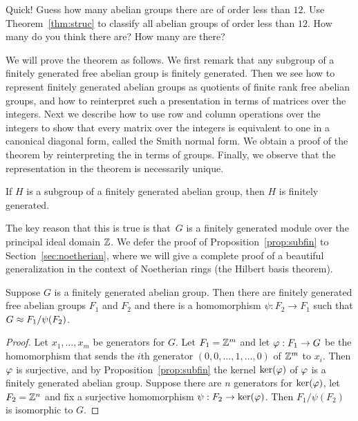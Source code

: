 \begin{exercise}
	Quick! Guess how many abelian groups there are of order less than $12$. Use Theorem~\ref{thm:struc} to classify all abelian groups of order less than $12$. How many do you think there are? How many are there?
\end{exercise}

We will prove the theorem as follows.  We first remark that any
subgroup of a finitely generated free abelian group is finitely
generated.  Then we see how to represent finitely generated abelian groups 
as quotients of finite rank free abelian groups, and how to
reinterpret such a presentation in terms of matrices over the
integers.  Next we describe how to use row and column operations over
the integers to show that every matrix over the integers is equivalent
to one in a canonical diagonal form, called the Smith normal form.  We
obtain a proof of the theorem by reinterpreting the  in
terms of groups.  Finally, we observe that
the representation in the theorem is necessarily unique. 

\begin{proposition}\label{prop:subfin}
If $H$ is a subgroup of a finitely generated abelian group, then $H$
is finitely generated.
\end{proposition}
The key reason that this is true is that~$G$ is a finitely generated
module over the principal ideal domain $\mathbb{Z}$.  We defer the
proof of Proposition~\ref{prop:subfin} to Section~\ref{sec:noetherian},
where we will give a complete proof of a beautiful generalization 
in the context of Noetherian rings (the Hilbert basis theorem).

\begin{corollary}\label{cor:presentation}
Suppose $G$ is a finitely generated abelian group.  Then there are
finitely generated free abelian groups $F_1$ and $F_2$ and there is
a homomorphism
$\psi:F_2 \to F_1$ such that
$G \approx F_1/\psi(F_2)$.
\end{corollary}
\begin{proof}
  Let $x_1,\ldots, x_m$ be generators for $G$.  Let $F_1=\mathbb{Z}^m$ and let
  $\varphi:F_1\to G$ be the homomorphism that sends the $i$th generator
  $(0,0,\ldots,1,\ldots,0)$ of $\mathbb{Z}^m$ to $x_i$.  Then $\varphi$ is
  surjective, and by Proposition~\ref{prop:subfin} the
  kernel $\ker(\varphi)$ of $\varphi$ is a finitely generated abelian
  group.
Suppose there are $n$ generators for $\ker(\varphi)$, let 
$F_2 = \mathbb{Z}^n$ and fix a surjective homomorphism $\psi:F_2
  \to \ker(\varphi)$.  Then $F_1 / \psi(F_2)$ is isomorphic to $G$.
\end{proof}


